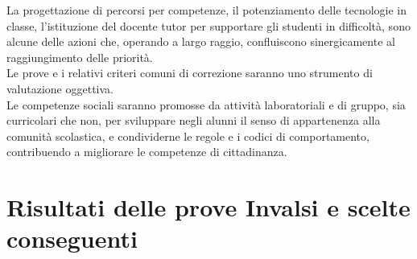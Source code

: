 \documentclass[12pt,a4paper,oneside]{memoir}
\begin{document}
La progettazione di percorsi per competenze, il potenziamento delle tecnologie in classe, l'istituzione del docente tutor per supportare gli studenti in difficoltà,  sono alcune delle azioni che, operando a largo raggio, confluiscono sinergicamente al raggiungimento delle priorità.\\

Le prove e i relativi criteri comuni di correzione saranno uno strumento di valutazione oggettiva.\\

Le competenze sociali saranno promosse da attività laboratoriali e di gruppo, sia curricolari che non, per sviluppare negli alunni il senso di appartenenza alla comunità scolastica, e condividerne le regole e i codici di comportamento, contribuendo a migliorare le competenze di cittadinanza.\\

\section{Risultati delle prove Invalsi e scelte conseguenti}
\end{document}
